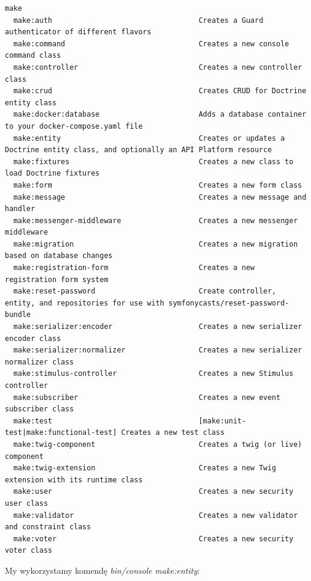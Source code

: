 \documentclass[polish, a4paper]{article}
\begin{document}
\begin{verbatim}
make
  make:auth                                  Creates a Guard authenticator of different flavors
  make:command                               Creates a new console command class
  make:controller                            Creates a new controller class
  make:crud                                  Creates CRUD for Doctrine entity class
  make:docker:database                       Adds a database container to your docker-compose.yaml file
  make:entity                                Creates or updates a Doctrine entity class, and optionally an API Platform resource
  make:fixtures                              Creates a new class to load Doctrine fixtures
  make:form                                  Creates a new form class
  make:message                               Creates a new message and handler
  make:messenger-middleware                  Creates a new messenger middleware
  make:migration                             Creates a new migration based on database changes
  make:registration-form                     Creates a new registration form system
  make:reset-password                        Create controller, entity, and repositories for use with symfonycasts/reset-password-bundle
  make:serializer:encoder                    Creates a new serializer encoder class
  make:serializer:normalizer                 Creates a new serializer normalizer class
  make:stimulus-controller                   Creates a new Stimulus controller
  make:subscriber                            Creates a new event subscriber class
  make:test                                  [make:unit-test|make:functional-test] Creates a new test class
  make:twig-component                        Creates a twig (or live) component
  make:twig-extension                        Creates a new Twig extension with its runtime class
  make:user                                  Creates a new security user class
  make:validator                             Creates a new validator and constraint class
  make:voter                                 Creates a new security voter class
\end{verbatim}

My wykorzystamy komendę \emph{bin/console make:entity}:
\end{document}
